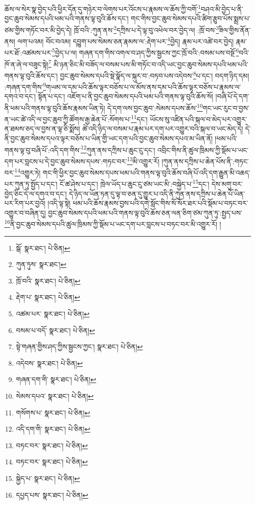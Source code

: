 ཆོས་ལ་སེར་སྣ་བྱེད་པའི་ཕྱིར་དོན་དུ་གཉེར་བ་ལེགས་པར་འོངས་པ་རྣམས་ལ་ཆོས་ཀྱི་བགོ་\footnote{སྒོ་  སྣར་ཐང་།  པེ་ཅིན། }བཤའ་མི་བྱེད་པ་ནི་བྱང་ཆུབ་སེམས་དཔའི་ཕམ་པའི་གནས་ལྟ་བུའི་ཆོས་དང་། གང་གིས་བྱང་ཆུབ་སེམས་དཔའི་ཚིག་རྩུབ་པོས་སྨྲས་པ་ཙམ་གྱིས་གཏོང་བར་མི་བྱེད་དེ། ཁྲོ་བའི་:ཀུན་ནས་\footnote{ཀུན་ཏུས་  སྣར་ཐང་། }དཀྲིས་པ་དེ་ལྟ་བུ་འཕེལ་བར་བྱེད་ལ། :ཁྲོ་བས་\footnote{ཁྲོ་བའི་  སྣར་ཐང་།  པེ་ཅིན། }ཟིལ་གྱིས་ནོན་ནས། ལག་པའམ། བོང་བའམ། དབྱུག་པས་སེམས་ཅན་རྣམས་ལ་:རྡེག་པར་\footnote{རྡེག་པ་  སྣར་ཐང་།  པེ་ཅིན། }བྱེད། རྣམ་པར་འཚེ་བར་བྱེད། རྣམ་པར་ཐོ་:འཚམས་པར་\footnote{འཚམ་པར་  སྣར་ཐང་།  པེ་ཅིན། }བྱེད་པ་ལ། གཞན་དག་གིས་འགལ་བ་ཤད་ཀྱིས་སྦྱངས་ཀྱང་ཁྲོ་བའི་:བསམ་པས་བསྔོ་\footnote{བསམ་པ་བདོ་  སྣར་ཐང་།  པེ་ཅིན། }བའི་ཁོ་ན་ཞེ་ལ་བཟུང་སྟེ།\footnote{སྟེ་གཞན་གྱིས་ཤད་ཀྱིས་སྦྱངས་ཀྱང་།  སྣར་ཐང་།  པེ་ཅིན། } མི་ཉན་ཅིང་མི་བཟོད་ལ་བསམ་པས་མི་གཏོང་བ་འདི་ཡང་བྱང་ཆུབ་སེམས་དཔའི་ཕམ་པའི་གནས་ལྟ་བུའི་ཆོས་དང་། བྱང་ཆུབ་སེམས་དཔའི་སྡེ་སྣོད་ལ་སྐུར་བ་:བཏབ་པས་འདེབས་\footnote{འདེབས་  སྣར་ཐང་།  པེ་ཅིན། }པ་དང་། བདག་ཉིད་དམ། :གཞན་དག་གིས་\footnote{གཞན་དག་གི་  སྣར་ཐང་།  པེ་ཅིན། }གཡམ་ལ་དམ་པའི་ཆོས་ལྟར་བཅོས་པ་ལ་མོས་ནས་དམ་པའི་ཆོས་ལྟར་བཅོས་པ་རྣམས་ལ་དགའ་བ་དང་། སྟོན་པ་དང་། འཇོག་པ་ནི་བྱང་ཆུབ་སེམས་དཔའི་ཕམ་པའི་གནས་ལྟ་བུའི་ཆོས་སོ། །བཞི་པོ་དེ་དག་ནི་ཕམ་པའི་གནས་ལྟ་བུའི་ཆོས་རྣམས་ཡིན་ཏེ། དེ་དག་ལས་བྱང་ཆུབ་:སེམས་དཔས་ཆོས་\footnote{སེམས་དཔའ་  སྣར་ཐང་།  པེ་ཅིན། }གང་ཡང་རུང་བ་བྱས་ན་ཡང་ཚེ་འདི་ལ་བྱང་ཆུབ་ཀྱི་ཚོགས་རྒྱ་ཆེན་པོ་:སོགས་པ་\footnote{གསོགས་པ་  སྣར་ཐང་།  པེ་ཅིན། }དང་། ཡོངས་སུ་འཛིན་པའི་སྐལ་བ་མེད་པར་འགྱུར་ན་ཐམས་ཅད་ལ་བྱས་ན་ལྟ་ཅི་སྨོས། ཚེ་འདི་ཉིད་ལ་བསམ་པ་རྣམ་པར་དག་པར་འགྱུར་བའི་སྐལ་བ་ཡང་མེད་དེ། དེ་ནི་བྱང་ཆུབ་སེམས་དཔའ་ལྟར་བཅོས་པ་ཡིན་གྱི་ཡང་དག་པའི་བྱང་ཆུབ་སེམས་དཔའ་མ་ཡིན་ནོ། །ཕམ་པའི་གནས་ལྟ་བུ་བཞི་པོ་:འདི་དག་གིས་\footnote{འདི་དག་གི་  སྣར་ཐང་།  པེ་ཅིན། }ཀུན་ནས་དཀྲིས་པ་ཆུང་ངུ་དང་། འབྲིང་གིས་ནི་ཚུལ་ཁྲིམས་ཀྱི་སྡོམ་པ་ཡང་དག་པར་བླངས་པ་དེ་བྱང་ཆུབ་སེམས་དཔས་:གཏང་བར་\footnote{བཏང་བར་  སྣར་ཐང་།  པེ་ཅིན། }མི་འགྱུར་རོ། །ཀུན་ནས་དཀྲིས་པ་ཆེན་པོས་ནི་:གཏང་བར་\footnote{བཏང་བར་  སྣར་ཐང་།  པེ་ཅིན། }འགྱུར་ཏེ། གང་གི་ཕྱིར་བྱང་ཆུབ་སེམས་དཔས་ཕམ་པའི་གནས་ལྟ་བུའི་ཆོས་བཞི་པོ་འདི་དག་རྒྱུན་མི་འཆད་པར་ཀུན་ཏུ་སྤྱོད་པ་དང་། ངོ་ཚ་ཤེས་པ་དང་། ཁྲེལ་ཡོད་པ་ཆུང་ངུ་ཙམ་ཡང་མི་:བསྐྱེད་པ་\footnote{སྐྱེད་པ་  སྣར་ཐང་།  པེ་ཅིན། }དང་། དེས་མགུ་བར་བྱེད་ཅིང་དེ་ལ་དགའ་བ་དང་། དེ་ཉིད་ལ་ཡོན་ཏན་དུ་ལྟ་བ་ཅན་དུ་གྱུར་པ་འདི་ནི་ཀུན་ནས་དཀྲིས་པ་ཆེན་པོ་ཡིན་པར་རིག་པར་བྱའོ། །འདི་ལྟ་སྟེ། ཕམ་པའི་ཆོས་རྣམས་བྱས་པའི་དགེ་སློང་གིས་སོ་སོར་ཐར་པའི་སྡོམ་པ་བཏང་བར་འགྱུར་བ་བཞིན་དུ། བྱང་ཆུབ་སེམས་དཔའི་ཕམ་པའི་གནས་ལྟ་བུའི་ཆོས་ཅན་ལན་ཅིག་ཙམ་ཀུན་ཏུ་:སྤྱད་པས་\footnote{དཔྱད་པས་  སྣར་ཐང་།  པེ་ཅིན། }ནི་བྱང་ཆུབ་སེམས་དཔའི་ཚུལ་ཁྲིམས་ཀྱི་སྡོམ་པ་ཡང་དག་པར་བླངས་པ་བཏང་བར་མི་འགྱུར་རོ། །
